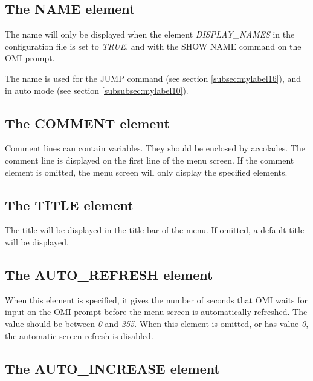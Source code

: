 \documentclass[a4paper]{book}
\newcommand{\vs}{\vspace{3mm}}
\begin{document}
\subsection{The NAME element}
\label{subsubsec:mylabel24}

The name will only be displayed when the element \textsl{DISPLAY{\_}NAMES} in the 
configuration file is set to \textsl{TRUE}, and with the \textsf{SHOW NAME} command on the OMI prompt.

\vs

The name is used for the \textsf{JUMP} command (see section \ref{subsec:mylabel16}),
and in auto mode (see section \ref{subsubsec:mylabel10}).

\subsection{The COMMENT element}
\label{subsubsec:mylabel25}

Comment lines can contain variables. They should be enclosed by accolades. 
The comment line is displayed on the first line of the menu screen. If the 
comment element is omitted, the menu screen will only display the specified 
elements.

\subsection{The TITLE element}
\label{subsubsec:mylabel26}

The title will be displayed in the title bar of the menu. If omitted, a 
default title will be displayed.

\subsection{The AUTO{\_}REFRESH element}
\label{subsubsec:mylabel27}

When this element is specified, it gives the number of seconds that OMI 
waits for input on the OMI prompt before the menu screen is automatically 
refreshed. The value should be between \textsl{0} and \textsl{255}. When this element is 
omitted, or has value \textsl{0}, the automatic screen refresh is disabled.

\subsection{The AUTO{\_}INCREASE element}
\label{subsubsec:mylabel28}
\end{document}
